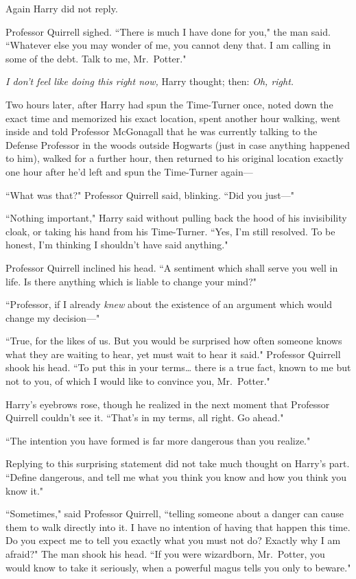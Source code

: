 Again Harry did not reply.

Professor Quirrell sighed. ``There is much I have done for you," the man said. ``Whatever else you may wonder of me, you cannot deny that. I am calling in some of the debt. Talk to me, Mr.~Potter."

\emph{I don't feel like doing this right now,} Harry thought; then: \emph{Oh, right.}

\later

Two hours later, after Harry had spun the Time-Turner once, noted down the exact time and memorized his exact location, spent another hour walking, went inside and told Professor McGonagall that he was currently talking to the Defense Professor in the woods outside Hogwarts (just in case anything happened to him), walked for a further hour, then returned to his original location exactly one hour after he'd left and spun the Time-Turner again---

\later

``What was that?" Professor Quirrell said, blinking. ``Did you just---"

``Nothing important," Harry said without pulling back the hood of his invisibility cloak, or taking his hand from his Time-Turner. ``Yes, I'm still resolved. To be honest, I'm thinking I shouldn't have said anything."

Professor Quirrell inclined his head. ``A sentiment which shall serve you well in life. Is there anything which is liable to change your mind?"

``Professor, if I already \emph{knew} about the existence of an argument which would change my decision---"

``True, for the likes of us. But you would be surprised how often someone knows what they are waiting to hear, yet must wait to hear it said." Professor Quirrell shook his head. ``To put this in your terms{\ldots} there is a true fact, known to me but not to you, of which I would like to convince you, Mr.~Potter."

Harry's eyebrows rose, though he realized in the next moment that Professor Quirrell couldn't see it. ``That's in my terms, all right. Go ahead."

``The intention you have formed is far more dangerous than you realize."

Replying to this surprising statement did not take much thought on Harry's part. ``Define dangerous, and tell me what you think you know and how you think you know it."

``Sometimes," said Professor Quirrell, ``telling someone about a danger can cause them to walk directly into it. I have no intention of having that happen this time. Do you expect me to tell you exactly what you must not do? Exactly why I am afraid?" The man shook his head. ``If you were wizardborn, Mr.~Potter, you would know to take it seriously, when a powerful magus tells you only to beware."

